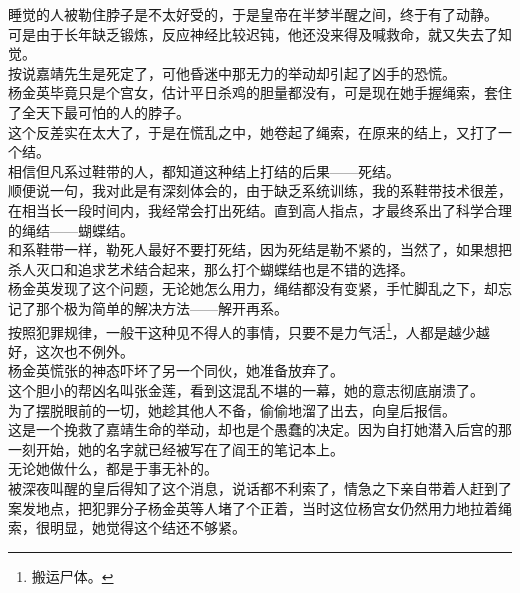 \begin{multicols}{\theparacolNo}
睡觉的人被勒住脖子是不太好受的，于是皇帝在半梦半醒之间，终于有了动静。\\

可是由于长年缺乏锻炼，反应神经比较迟钝，他还没来得及喊救命，就又失去了知觉。\\

按说嘉靖先生是死定了，可他昏迷中那无力的举动却引起了凶手的恐慌。\\

杨金英毕竟只是个宫女，估计平日杀鸡的胆量都没有，可是现在她手握绳索，套住了全天下最可怕的人的脖子。\\

这个反差实在太大了，于是在慌乱之中，她卷起了绳索，在原来的结上，又打了一个结。\\

相信但凡系过鞋带的人，都知道这种结上打结的后果——死结。\\

顺便说一句，我对此是有深刻体会的，由于缺乏系统训练，我的系鞋带技术很差，在相当长一段时间内，我经常会打出死结。直到高人指点，才最终系出了科学合理的绳结——蝴蝶结。\\

和系鞋带一样，勒死人最好不要打死结，因为死结是勒不紧的，当然了，如果想把杀人灭口和追求艺术结合起来，那么打个蝴蝶结也是不错的选择。\\

杨金英发现了这个问题，无论她怎么用力，绳结都没有变紧，手忙脚乱之下，却忘记了那个极为简单的解决方法——解开再系。\\

按照犯罪规律，一般干这种见不得人的事情，只要不是力气活\footnote{搬运尸体。}，人都是越少越好，这次也不例外。\\

杨金英慌张的神态吓坏了另一个同伙，她准备放弃了。\\

这个胆小的帮凶名叫张金莲，看到这混乱不堪的一幕，她的意志彻底崩溃了。\\

为了摆脱眼前的一切，她趁其他人不备，偷偷地溜了出去，向皇后报信。\\

这是一个挽救了嘉靖生命的举动，却也是个愚蠢的决定。因为自打她潜入后宫的那一刻开始，她的名字就已经被写在了阎王的笔记本上。\\

无论她做什么，都是于事无补的。\\

被深夜叫醒的皇后得知了这个消息，说话都不利索了，情急之下亲自带着人赶到了案发地点，把犯罪分子杨金英等人堵了个正着，当时这位杨宫女仍然用力地拉着绳索，很明显，她觉得这个结还不够紧。\\


\end{multicols}

